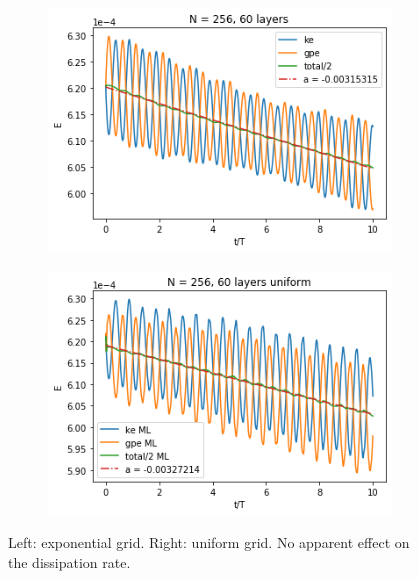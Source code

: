 \documentclass{article}
\begin{document}
\begin{figure}[H]
    \begin{subfigure}{0.5\linewidth}
    \includegraphics[width=\linewidth]{figures/stokes_ak01_256.png} 
    \end{subfigure}
    \begin{subfigure}{0.5\linewidth}
    \includegraphics[width=\linewidth]{figures/stokes_ak01_256_uniform.png}
    \end{subfigure}
    \caption{Left: exponential grid. Right: uniform grid. No apparent effect on the dissipation rate.}
    \label{fig:fig1}
\end{figure}
\end{document}

